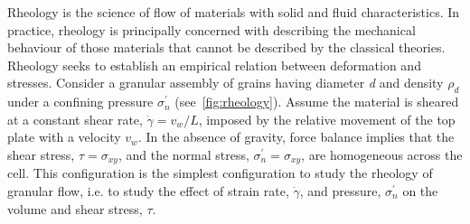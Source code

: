 Rheology is the science of flow of materials with solid and fluid 
characteristics. In practice, rheology is principally concerned with describing 
the mechanical behaviour of those materials that cannot be described by the 
classical theories. Rheology seeks to establish an empirical relation between 
deformation and stresses. Consider a granular assembly of grains having 
diameter \textit{d} and density $\rho_{\mathit{d}}$ under a confining pressure 
$\sigma_n^\prime$ (see~\cref{fig:rheology}). Assume the material is sheared 
at a constant shear rate, $\dot{\gamma} = \mathit{v}_{\mathit{w}} / 
\mathit{L}$, imposed by the relative movement of the top plate with a velocity 
$\mathit{v}_{\mathit{w}}$. In the absence of gravity, force balance implies 
that the shear stress, $\tau= \sigma_{\mathit{xy}}$, and the normal stress, 
$\sigma_n^\prime=\sigma_{\mathit{xy}}$, are homogeneous across the cell. This 
configuration is the simplest configuration to study the rheology of granular 
flow, i.e. to study the effect of strain rate, $\dot{\gamma}$, and 
pressure, $\sigma_n^\prime$ on the volume and shear stress, $\tau$. 

